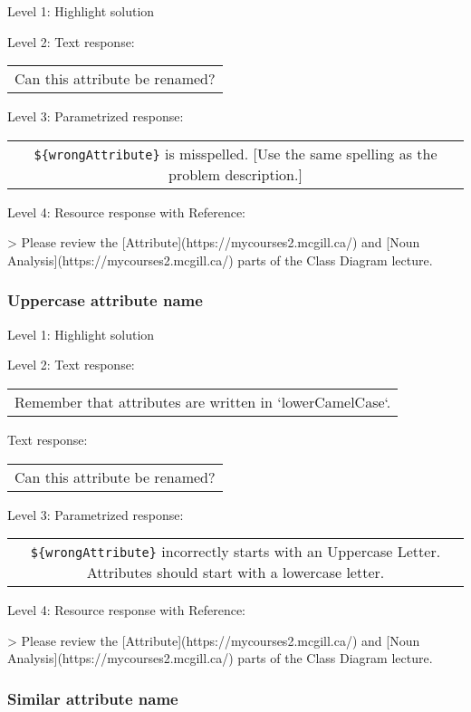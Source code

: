\noindent Level 1: Highlight solution \medskip

\noindent Level 2: Text response: \medskip

\begin{tabular}{|c}
Can this attribute be renamed?
\end{tabular} \medskip

\noindent Level 3: Parametrized response: \medskip

\begin{tabular}{|c}
\verb|${wrongAttribute}| is misspelled. [Use the same spelling as the problem description.]
\end{tabular} \medskip

\noindent Level 4: Resource response with Reference:

> Please review the [Attribute](https://mycourses2.mcgill.ca/) and [Noun Analysis](https://mycourses2.mcgill.ca/) parts of the Class Diagram lecture.


\subsubsection{Uppercase attribute name}

\noindent Level 1: Highlight solution \medskip

\noindent Level 2: Text response: \medskip

\begin{tabular}{|c}
Remember that attributes are written in `lowerCamelCase`.
\end{tabular} \medskip

Text response: \medskip

\begin{tabular}{|c}
Can this attribute be renamed?
\end{tabular} \medskip

\noindent Level 3: Parametrized response: \medskip

\begin{tabular}{|c}
\verb|${wrongAttribute}| incorrectly starts with an Uppercase Letter. Attributes should start with a lowercase letter.
\end{tabular} \medskip

\noindent Level 4: Resource response with Reference:

> Please review the [Attribute](https://mycourses2.mcgill.ca/) and [Noun Analysis](https://mycourses2.mcgill.ca/) parts of the Class Diagram lecture.


\subsubsection{Similar attribute name}

